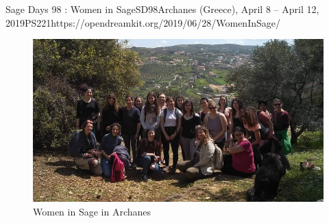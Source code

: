 \begin{event}{Sage Days 98 : Women in Sage}{SD98}{Archanes (Greece), April 8 -- April 12, 2019}{PS}{22}{1}{https://opendreamkit.org/2019/06/28/WomenInSage/}
\begin{figure}[ht]
\includegraphics[scale=.3]{group_photo_head.jpeg}
\caption*{Women in Sage in Archanes}
\end{figure}



\end{event}
